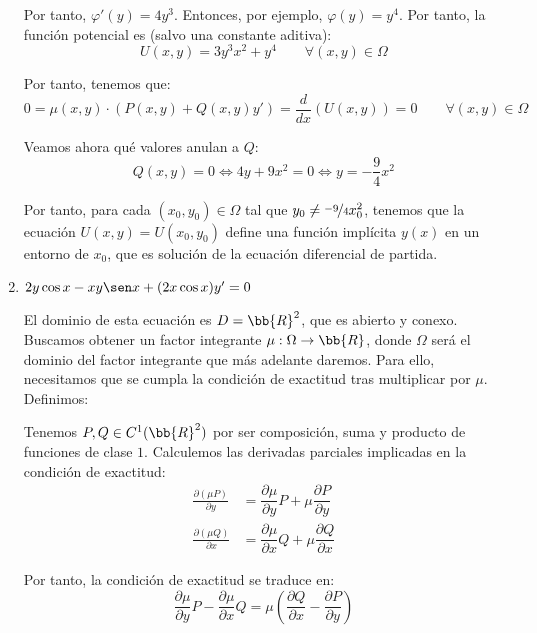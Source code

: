 \begin{ejercicio}
\begin{enumerate}
        Por tanto, $\varphi'(y)=4y^3$. Entonces, por ejemplo, $\varphi(y)=y^4$. Por tanto, la función potencial es (salvo una constante aditiva):
        \begin{equation*}
            U(x,y)=3y^3x^2+y^4\qquad \forall (x,y)\in\Omega
        \end{equation*}

        Por tanto, tenemos que:
        \begin{equation*}
            0=\mu(x,y)\cdot (P(x,y)+Q(x,y)y')=\dfrac{d}{dx}\left(U(x,y)\right)=0\qquad \forall (x,y)\in\Omega
        \end{equation*}

        Veamos ahora qué valores anulan a $Q$:
        \begin{equation*}
            Q(x,y)=0 \Longleftrightarrow
            4y + 9x^2 = 0 \Longleftrightarrow y=-\frac{9}{4}x^2
        \end{equation*}

        Por tanto, para cada $(x_0, y_0)\in \Omega$ tal que $y_0\neq \nicefrac{-9}{4}x_0^2$, tenemos que la ecuación $U(x,y)=U(x_0,y_0)$ define una función implícita $y(x)$ en un entorno de $x_0$, que es solución de la ecuación diferencial de partida.

        \item $2y \cos x - xy \sen x + (2x \cos x)y' = 0$
        
        El dominio de esta ecuación es $D=\bb{R}^2$, que es abierto y conexo. Buscamos obtener un factor integrante $\mu:\Omega \to\bb{R}$, donde $\Omega$ será el dominio del factor integrante que más adelante daremos. Para ello, necesitamos que se cumpla la condición de exactitud tras multiplicar por $\mu$. Definimos:

        Tenemos $P,Q\in C^1(\bb{R}^2)$ por ser composición, suma y producto de funciones de clase $1$. Calculemos las derivadas parciales implicadas en la condición de exactitud:
        \begin{align*}
            \frac{\partial (\mu P)}{\partial y} &= \dfrac{\partial \mu}{\partial y}P+\mu\dfrac{\partial P}{\partial y}\\
            \frac{\partial (\mu Q)}{\partial x} &= \dfrac{\partial \mu}{\partial x}Q+\mu\dfrac{\partial Q}{\partial x}
        \end{align*}

        Por tanto, la condición de exactitud se traduce en:
        \begin{equation*}
            \dfrac{\partial \mu}{\partial y}P- \dfrac{\partial \mu}{\partial x}Q = \mu\left(\dfrac{\partial Q}{\partial x}-\dfrac{\partial P}{\partial y}\right)
        \end{equation*}


\end{enumerate}
\end{ejercicio}
